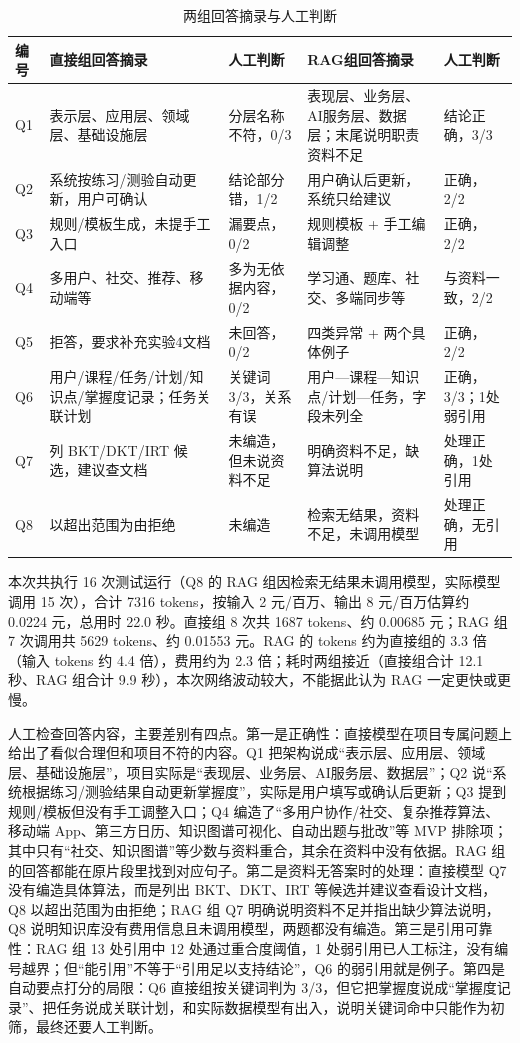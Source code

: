 \documentclass[UTF8,12pt,a4paper]{ctexart}
\begin{document}
\begin{table}[H]
\centering
\caption{两组回答摘录与人工判断}
\label{tab:judgement}
\scriptsize
\begin{tabularx}{\textwidth}{p{0.7cm}p{4.2cm}p{2.4cm}p{4.1cm}p{2.0cm}}
\toprule
编号 & 直接组回答摘录 & 人工判断 & RAG组回答摘录 & 人工判断 \\
\midrule
Q1 & 表示层、应用层、领域层、基础设施层 & 分层名称不符，0/3 & 表现层、业务层、AI服务层、数据层；末尾说明职责资料不足 & 结论正确，3/3 \\
Q2 & 系统按练习/测验自动更新，用户可确认 & 结论部分错，1/2 & 用户确认后更新，系统只给建议 & 正确，2/2 \\
Q3 & 规则/模板生成，未提手工入口 & 漏要点，0/2 & 规则模板 + 手工编辑调整 & 正确，2/2 \\
Q4 & 多用户、社交、推荐、移动端等 & 多为无依据内容，0/2 & 学习通、题库、社交、多端同步等 & 与资料一致，2/2 \\
Q5 & 拒答，要求补充实验4文档 & 未回答，0/2 & 四类异常 + 两个具体例子 & 正确，2/2 \\
Q6 & 用户/课程/任务/计划/知识点/掌握度记录；任务关联计划 & 关键词 3/3，关系有误 & 用户—课程—知识点/计划—任务，字段未列全 & 正确，3/3；1处弱引用 \\
Q7 & 列 BKT/DKT/IRT 候选，建议查文档 & 未编造，但未说资料不足 & 明确资料不足，缺算法说明 & 处理正确，1处引用 \\
Q8 & 以超出范围为由拒绝 & 未编造 & 检索无结果，资料不足，未调用模型 & 处理正确，无引用 \\
\bottomrule
\end{tabularx}
\end{table}

本次共执行 16 次测试运行（Q8 的 RAG 组因检索无结果未调用模型，实际模型调用 15 次），合计 7316 tokens，按输入 2 元/百万、输出 8 元/百万估算约 0.0224 元，总用时 22.0 秒。直接组 8 次共 1687 tokens、约 0.00685 元；RAG 组 7 次调用共 5629 tokens、约 0.01553 元。RAG 的 tokens 约为直接组的 3.3 倍（输入 tokens 约 4.4 倍），费用约为 2.3 倍；耗时两组接近（直接组合计 12.1 秒、RAG 组合计 9.9 秒），本次网络波动较大，不能据此认为 RAG 一定更快或更慢。

人工检查回答内容，主要差别有四点。第一是正确性：直接模型在项目专属问题上给出了看似合理但和项目不符的内容。Q1 把架构说成“表示层、应用层、领域层、基础设施层”，项目实际是“表现层、业务层、AI服务层、数据层”；Q2 说“系统根据练习/测验结果自动更新掌握度”，实际是用户填写或确认后更新；Q3 提到规则/模板但没有手工调整入口；Q4 编造了“多用户协作/社交、复杂推荐算法、移动端 App、第三方日历、知识图谱可视化、自动出题与批改”等 MVP 排除项；其中只有“社交、知识图谱”等少数与资料重合，其余在资料中没有依据。RAG 组的回答都能在原片段里找到对应句子。第二是资料无答案时的处理：直接模型 Q7 没有编造具体算法，而是列出 BKT、DKT、IRT 等候选并建议查看设计文档，Q8 以超出范围为由拒绝；RAG 组 Q7 明确说明资料不足并指出缺少算法说明，Q8 说明知识库没有费用信息且未调用模型，两题都没有编造。第三是引用可靠性：RAG 组 13 处引用中 12 处通过重合度阈值，1 处弱引用已人工标注，没有编号越界；但“能引用”不等于“引用足以支持结论”，Q6 的弱引用就是例子。第四是自动要点打分的局限：Q6 直接组按关键词判为 3/3，但它把掌握度说成“掌握度记录”、把任务说成关联计划，和实际数据模型有出入，说明关键词命中只能作为初筛，最终还要人工判断。
\end{document}
